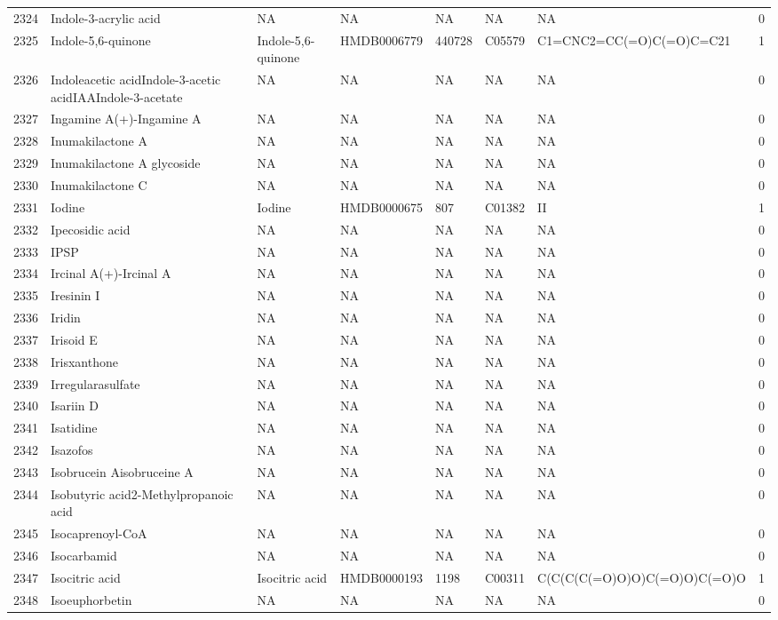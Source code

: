 \documentclass[a4paper]{article}
\begin{document}
\begin{longtable}{rlllllll}
  2324 & Indole-3-acrylic acid & NA & NA & NA & NA & NA & 0 \\ 
  2325 & Indole-5,6-quinone & Indole-5,6-quinone & HMDB0006779 & 440728 & C05579 & C1=CNC2=CC(=O)C(=O)C=C21 & 1 \\ 
  2326 & Indoleacetic acidIndole-3-acetic acidIAAIndole-3-acetate & NA & NA & NA & NA & NA & 0 \\ 
  2327 & Ingamine A(+)-Ingamine A & NA & NA & NA & NA & NA & 0 \\ 
  2328 & Inumakilactone A & NA & NA & NA & NA & NA & 0 \\ 
  2329 & Inumakilactone A glycoside & NA & NA & NA & NA & NA & 0 \\ 
  2330 & Inumakilactone C & NA & NA & NA & NA & NA & 0 \\ 
  2331 & Iodine & Iodine & HMDB0000675 & 807 & C01382 & II & 1 \\ 
  2332 & Ipecosidic acid & NA & NA & NA & NA & NA & 0 \\ 
  2333 & IPSP & NA & NA & NA & NA & NA & 0 \\ 
  2334 & Ircinal A(+)-Ircinal A & NA & NA & NA & NA & NA & 0 \\ 
  2335 & Iresinin I & NA & NA & NA & NA & NA & 0 \\ 
  2336 & Iridin & NA & NA & NA & NA & NA & 0 \\ 
  2337 & Irisoid E & NA & NA & NA & NA & NA & 0 \\ 
  2338 & Irisxanthone & NA & NA & NA & NA & NA & 0 \\ 
  2339 & Irregularasulfate & NA & NA & NA & NA & NA & 0 \\ 
  2340 & Isariin D & NA & NA & NA & NA & NA & 0 \\ 
  2341 & Isatidine & NA & NA & NA & NA & NA & 0 \\ 
  2342 & Isazofos & NA & NA & NA & NA & NA & 0 \\ 
  2343 & Isobrucein Aisobruceine A & NA & NA & NA & NA & NA & 0 \\ 
  2344 & Isobutyric acid2-Methylpropanoic acid & NA & NA & NA & NA & NA & 0 \\ 
  2345 & Isocaprenoyl-CoA & NA & NA & NA & NA & NA & 0 \\ 
  2346 & Isocarbamid & NA & NA & NA & NA & NA & 0 \\ 
  2347 & Isocitric acid & Isocitric acid & HMDB0000193 & 1198 & C00311 & C(C(C(C(=O)O)O)C(=O)O)C(=O)O & 1 \\ 
  2348 & Isoeuphorbetin & NA & NA & NA & NA & NA & 0 \\ 

\end{longtable}
\end{document}
